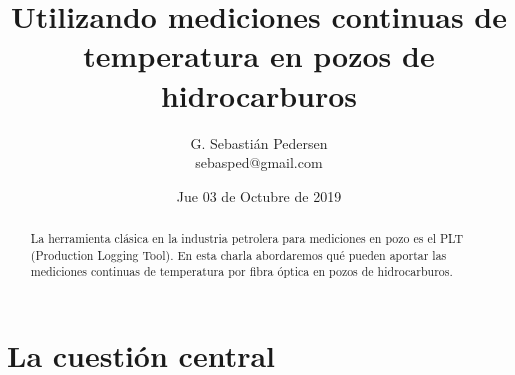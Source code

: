 \documentclass[presentation]{beamer}
\title[Mediciones temp.\\ Fibra Óptica \\ Pozos petroleros] %
{Utilizando mediciones continuas de temperatura en pozos de hidrocarburos}
\author[SP]
{G. Sebastián Pedersen\\
\small sebasped@gmail.com}%
\institute[] %
{3er. Ciclo de Charlas de Matemática --- ICI --- UNGS 
}
\date[] %
{Jue 03 de Octubre de 2019\\ 
}
\begin{document}
\begin{frame}
  \titlepage
  \vspace{-.5cm}
  \begin{abstract}
  	{La herramienta clásica en la industria petrolera para mediciones en pozo es el PLT (Production Logging Tool). En esta charla abordaremos qué pueden aportar las mediciones continuas de temperatura por fibra óptica en pozos de hidrocarburos.}
  \end{abstract}
  
\end{frame}


%
%
%
%
%
%
%
%
%
%
%
%
%
%
%




\section{La cuestión central}
\end{document}
